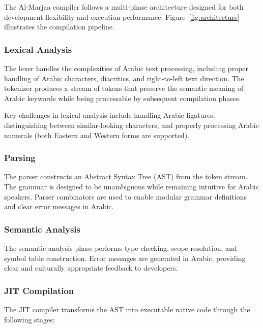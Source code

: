 \documentclass[11pt,a4paper]{article}
\begin{document}
The Al-Marjaa compiler follows a multi-phase architecture designed for both development flexibility and execution performance. Figure~\ref{fig:architecture} illustrates the compilation pipeline.

\subsubsection{Lexical Analysis}

The lexer handles the complexities of Arabic text processing, including proper handling of Arabic characters, diacritics, and right-to-left text direction. The tokenizer produces a stream of tokens that preserve the semantic meaning of Arabic keywords while being processable by subsequent compilation phases.

Key challenges in lexical analysis include handling Arabic ligatures, distinguishing between similar-looking characters, and properly processing Arabic numerals (both Eastern and Western forms are supported).

\subsubsection{Parsing}

The parser constructs an Abstract Syntax Tree (AST) from the token stream. The grammar is designed to be unambiguous while remaining intuitive for Arabic speakers. Parser combinators are used to enable modular grammar definitions and clear error messages in Arabic.

\subsubsection{Semantic Analysis}

The semantic analysis phase performs type checking, scope resolution, and symbol table construction. Error messages are generated in Arabic, providing clear and culturally appropriate feedback to developers.

\subsubsection{JIT Compilation}

The JIT compiler transforms the AST into executable native code through the following stages:
\end{document}
